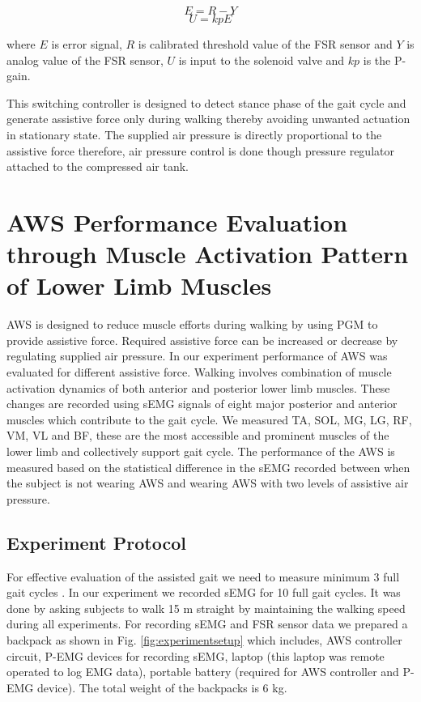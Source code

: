 \documentclass[letterpaper, 10 pt, conference]{ieeeconf}  %
\begin{document}
\begin{equation}\label{kevalue}
E = R - Y 
\end{equation}
\begin{equation}\label{uvalue}
U = kpE
\end{equation}

where $E$ is error signal, $R$ is calibrated threshold value of the FSR sensor and $Y$ is analog value of the FSR sensor, $U$ is input to the solenoid valve and $kp$ is the P-gain. 

This switching controller is designed to detect stance phase of the gait cycle and generate assistive force only during walking thereby avoiding unwanted actuation in stationary state. The supplied air pressure is directly proportional to the assistive force therefore, air pressure control is done though pressure regulator attached to the compressed air tank.


\section{AWS Performance Evaluation through Muscle Activation Pattern of Lower Limb Muscles} \label{Evaluation}
AWS is designed to reduce muscle efforts during walking by using PGM to provide assistive force. Required assistive force can be increased or decrease by regulating supplied air pressure. In our experiment performance of AWS was evaluated for different assistive force. Walking involves combination of muscle activation dynamics of both anterior and posterior lower limb muscles. These changes are recorded using sEMG signals of eight major posterior and anterior muscles which contribute to the gait cycle. We measured TA, SOL, MG, LG, RF, VM, VL and BF, these are the most accessible and prominent muscles of the lower limb and collectively support gait cycle. The performance of the AWS is measured based on the statistical difference in the sEMG recorded between when the subject is not wearing AWS and wearing AWS with two levels of assistive air pressure.

\subsection{Experiment Protocol}
For effective evaluation of the assisted gait we need to measure minimum 3 full gait cycles \cite{10}. In our experiment we recorded sEMG for 10 full gait cycles. It was done by asking subjects to walk 15 m straight by maintaining the walking speed during all experiments. For recording sEMG and FSR sensor data we prepared a backpack as shown in Fig. \ref{fig:experimentsetup} which includes, AWS controller circuit, P-EMG devices for recording sEMG, laptop (this laptop was remote operated to log EMG data), portable battery (required for AWS controller and P-EMG device). The total weight of the backpacks is 6 kg.
\end{document}
